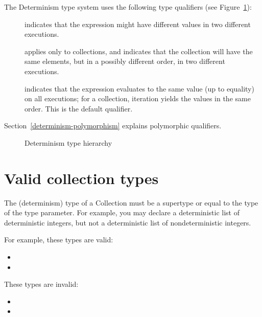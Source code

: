 The Determinism type system uses the following type qualifiers (see Figure~\ref{fig-determinism-hierarchy}):
\begin{description}
\item[] indicates
  that the expression might have different values in two different executions.
\item[] applies only
  to collections, and indicates that the collection will have the same
  elements, but in a possibly different order, in two different executions.
\item[] indicates that
  the expression evaluates to the same value (up to equality) on all
  executions; for a collection, iteration yields the values in the same
  order.
  This is the default qualifier.
\end{description}

Section~\ref{determinism-polymorphism} explains polymorphic qualifiers.

\begin{figure}
  \begin{center}
  \end{center}
\caption{Determinism type hierarchy}
\label{fig-determinism-hierarchy}
\end{figure}


\section{Valid collection types\label{determinism-collection-types}}

The (determinism) type of a Collection must be a supertype or equal to
the type of the type parameter.  For example, you may declare a
deterministic list of deterministic integers, but not a deterministic
list of nondeterministic integers.

For example, these types are valid:
\begin{itemize}
    \item {}
    \item {}\code{>}
\end{itemize}

These types are invalid:
  \begin{itemize}
    \item {}
    \item {}
  \end{itemize}

